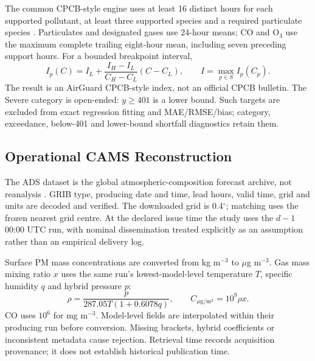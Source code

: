 \documentclass[journal]{IEEEtran}
\begin{document}
The common CPCB-style engine uses at least 16 distinct hours for each supported
pollutant, at least three supported species and a required particulate species
\cite{cpcb2014aqi}. Particulates and designated gases use 24-hour means;
CO and O$_3$ use the maximum complete trailing eight-hour mean, including
seven preceding support hours. For a bounded breakpoint interval,
\begin{equation}
I_p(C)=I_L+\frac{I_H-I_L}{C_H-C_L}(C-C_L),\qquad
I=\max_{p\in S}I_p(C_p).\label{eq:aqi}
\end{equation}
The result is an AirGuard CPCB-style index, not an official CPCB bulletin.
The Severe category is open-ended: $y\geq401$ is a lower bound.
Such targets are excluded from exact regression fitting and MAE/RMSE/bias;
category, exceedance, below-401 and lower-bound shortfall diagnostics retain them.

\subsection{Operational CAMS Reconstruction}
The ADS dataset is the global atmospheric-composition forecast archive,
not reanalysis \cite{cams2024forecasts}. GRIB type, producing date and time,
lead hours, valid time, grid and units are decoded and verified. The downloaded
grid is 0.4$^\circ$; matching uses the frozen nearest grid centre. At the declared
issue time the study uses the $d-1$ 00:00 UTC run, with nominal dissemination
treated explicitly as an assumption rather than an empirical delivery log.

Surface PM mass concentrations are converted from kg m$^{-3}$ to $\mu$g m$^{-3}$.
Gas mass mixing ratio $x$ uses the same run's lowest-model-level temperature
$T$, specific humidity $q$ and hybrid pressure $p$:
\begin{equation}
\rho=\frac{p}{287.05T(1+0.6078q)},\qquad C_{\mu\mathrm{g/m^3}}=10^9\rho x.
\label{eq:density}
\end{equation}
CO uses $10^6$ for mg m$^{-3}$. Model-level fields are interpolated within their
producing run before conversion. Missing brackets, hybrid coefficients or
inconsistent metadata cause rejection. Retrieval time records acquisition
provenance; it does not establish historical publication time.
\end{document}
